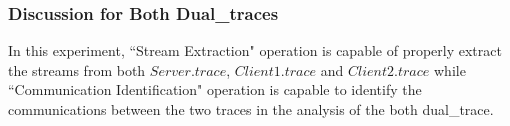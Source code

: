 \subsubsection{Discussion for Both Dual\_traces}
In this experiment, ``Stream Extraction" operation is capable of properly extract the streams from both $Server.trace$, $Client1.trace$ and $Client2.trace$ while ``Communication Identification" operation is capable to identify the communications between the two traces in the analysis of the both dual\_trace. 






   




